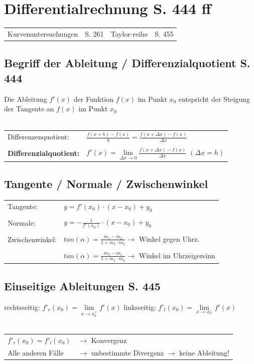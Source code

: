 \section{Differentialrechnung S. 444 ff}

				\begin{tabular}{llll} 
				Kurvenuntersuchungen & S. 261 & Taylor-reihe & S. 455 \\
				\end{tabular}
				
				
			\subsection{Begriff der Ableitung / Differenzialquotient S. 444}
			Die Ableitung $f'(x)$ der Funktion $f(x)$ im Punkt $x_0$ entspricht der Steigung der Tangente an	$f(x)$ im Punkt $x_0$		 \\
			\\
			\begin{tabular}{ll}
			Differenzenquotient: & $\frac{f(x + h) - f(x)}{h} = \frac{f(x + \Delta x) - f(x)}{\Delta x}$ \\
			\\
			\textbf{Differenzialquotient:} & $f'(x) = \lim\limits_{\Delta x \to 0} \frac{f(x + \Delta x) - f(x)}{\Delta x}$ \quad $(\Delta x = h)$ \\
			\end{tabular}
			

			\subsection{Tangente / Normale / Zwischenwinkel}
			\begin{tabular}{ll}
			Tangente: & $y = f'(x_0) \cdot (x - x_0) + y_0$ \\
			\\
			Normale: & $y = -\frac{1}{f'(x_0)} \cdot (x - x_0) + y_0$ \\	
			\\
			Zwischenwinkel: &  $tan(\alpha) = \frac{m_1 - m_2}{1 + m_1 \cdot m_2} \rightarrow$ Winkel gegen Uhrz.\\
			\\
			&  $tan(\alpha) =  \frac{m_2 - m_1}{1 + m_1 \cdot m_2} \rightarrow$ Winkel im Uhrzeigersinn\\
			
			\end{tabular}
			
			
			\subsection{Einseitige Ableitungen S. 445}
			rechtsseitig: $f'_r(x_0) = \lim\limits_{x \to x_0^+}f'(x)$ \quad
			linksseitig: $f'_l(x_0) = \lim\limits_{x \to x_0^-}f'(x)$ \\
			\\
			\begin{tabular}{ll}
			$f'_r(x_0) = f'_l(x_0)$ & $\rightarrow$ Konvergenz \\
			Alle anderen Fälle & $\rightarrow$ unbestimmte Divergenz $\rightarrow$ keine Ableitung! \\
			\end{tabular}
			
